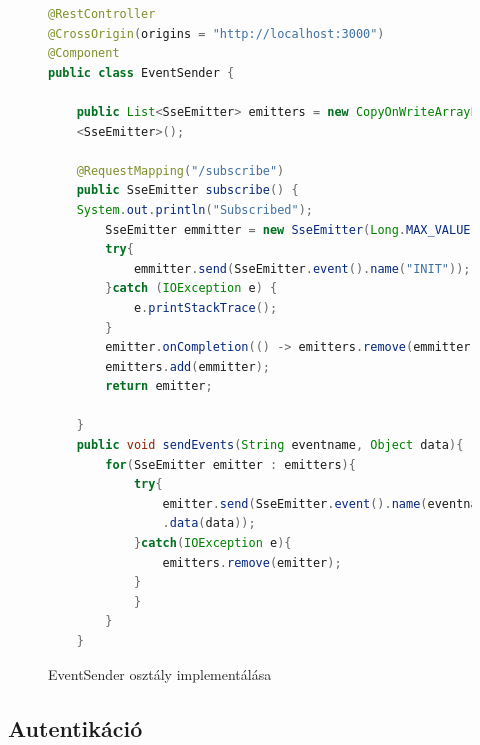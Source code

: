 \documentclass[a4paper,twoside]{article}
\begin{document}
\begin{figure}[ht]
	\caption{EventSender osztály implementálása}
	\begin{minipage}{\textwidth}
	\begin{lstlisting}[language=java,breaklines=true]	
@RestController
@CrossOrigin(origins = "http://localhost:3000")
@Component
public class EventSender {
		
	public List<SseEmitter> emitters = new CopyOnWriteArrayList
	<SseEmitter>();
		
	@RequestMapping("/subscribe")
	public SseEmitter subscribe() {
	System.out.println("Subscribed");
		SseEmitter emmitter = new SseEmitter(Long.MAX_VALUE);
		try{
			emmitter.send(SseEmitter.event().name("INIT"));
		}catch (IOException e) {
			e.printStackTrace();
		}
		emitter.onCompletion(() -> emitters.remove(emmitter));
		emitters.add(emmitter);
		return emitter;
		
	}
	public void sendEvents(String eventname, Object data){
		for(SseEmitter emitter : emitters){
			try{
				emitter.send(SseEmitter.event().name(eventname)
				.data(data));
			}catch(IOException e){
				emitters.remove(emitter);
			}
			}
		}
	}
	\end{lstlisting}
	\end{minipage}
	\label{eventsender}
\end{figure} 
\FloatBarrier


\subsection{Autentikáció}
\end{document}
